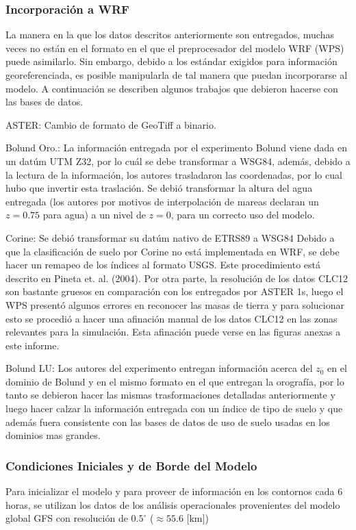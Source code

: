 \subsubsection{Incorporación a WRF}
La manera en la que los datos descritos anteriormente son entregados, muchas veces no están en el formato en el que el preprocesador del modelo WRF (WPS) puede asimilarlo. Sin embargo, debido a los estándar exigidos para información georeferenciada, es posible manipularla de tal manera que puedan incorporarse al modelo. A continuación se describen algunos trabajos que debieron hacerse con las bases de datos.
\begin{enumerate*}
	\item ASTER: Cambio de formato de GeoTiff a binario.
	\item Bolund Oro.: La información entregada por el experimento Bolund viene dada en un datúm UTM Z32, por lo cuál se debe transformar a WSG84, además, debido a la lectura de la información, los autores trasladaron las coordenadas, por lo cual hubo que invertir esta traslación. Se debió transformar la altura del agua entregada (los autores por motivos de interpolación de mareas declaran un $z=0.75$ para agua) a un nivel de $z=0$, para un correcto uso del modelo. 
	\item Corine: Se debió transformar su datúm nativo de ETRS89 a WSG84 Debido a que la clasificación de suelo por Corine no está implementada en WRF, se debe hacer un remapeo de los índices al formato USGS. Este procedimiento está descrito en Pineta et. al. (2004). Por otra parte, la resolución de los datos CLC12 son bastante gruesos en comparación con los entregados por ASTER 1s, luego el WPS presentó algunos errores en reconocer las masas de tierra y para solucionar esto se procedió a hacer una afinación manual de los datos CLC12 en las zonas relevantes para la simulación. Esta afinación puede verse en las figuras anexas a este informe.
	\item Bolund LU: Los autores del experimento entregan información acerca del $z_0$ en el dominio de Bolund y en el mismo formato en el que entregan la orografía, por lo tanto se debieron hacer las mismas trasformaciones detalladas anteriormente y luego hacer calzar la información entregada con un índice de tipo de suelo y que además fuera consistente con las bases de datos de uso de suelo usadas en los dominios mas grandes.
\end{enumerate*}
\subsubsection{Condiciones Iniciales y de Borde del Modelo}
Para inicializar el modelo y para proveer de información en los contornos cada 6 horas, se utilizan los datos de los análisis operacionales provenientes del modelo global GFS con resolución de $0.5^\circ$ ($\approx 55.6$ [km])

